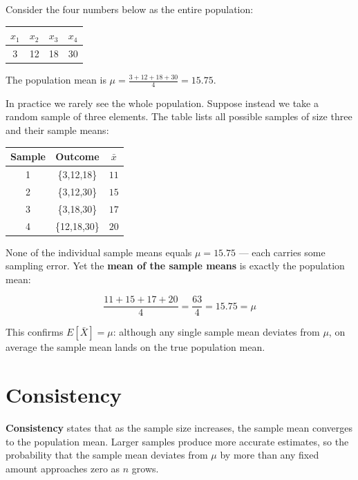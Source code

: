 \documentclass[
  11pt,
  letterpaper,
  DIV=11,
  numbers=noendperiod,
  oneside,
  open=any]{scrreprt}
\begin{document}
\begin{bsexample}[Example]

Consider the four numbers below as the entire population:

\begin{center}
\begin{tabular}{cccc}
\toprule
\(x_1\) & \(x_2\) & \(x_3\) & \(x_4\) \\
\midrule
3 & 12 & 18 & 30 \\
\bottomrule
\end{tabular}
\end{center}

The population mean is \(\mu = \frac{3 + 12 + 18 + 30}{4} = 15.75\).

In practice we rarely see the whole population. Suppose instead we take
a random sample of three elements. The table lists all possible samples
of size three and their sample means:

\begin{center}
\begin{tabular}{ccc}
\toprule
Sample & Outcome & \(\bar{x}\) \\
\midrule
1 & \{3,12,18\} & \(11\) \\
2 & \{3,12,30\} & \(15\) \\
3 & \{3,18,30\} & \(17\) \\
4 & \{12,18,30\} & \(20\) \\
\bottomrule
\end{tabular}
\end{center}

None of the individual sample means equals \(\mu = 15.75\) --- each
carries some sampling error. Yet the \textbf{mean of the sample means}
is exactly the population mean:

\[\frac{11 + 15 + 17 + 20}{4} = \frac{63}{4} = 15.75 = \mu\]

This confirms \(E[\bar{X}] = \mu\): although any single sample mean
deviates from \(\mu\), on average the sample mean lands on the true
population mean.

\end{bsexample}

\section{Consistency}\label{consistency}

\textbf{Consistency} states that as the sample size increases, the
sample mean converges to the population mean. Larger samples produce
more accurate estimates, so the probability that the sample mean
deviates from \(\mu\) by more than any fixed amount approaches zero as
\(n\) grows.
\end{document}
